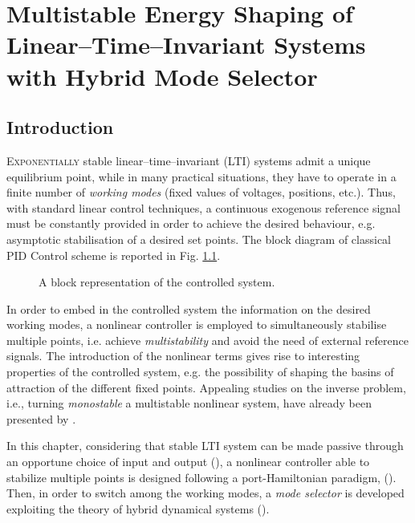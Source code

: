 %
\chapter{Multistable Energy Shaping of Linear--Time--Invariant Systems with Hybrid Mode Selector}

\label{chap:multistable}
\minitoc

\thispagestyle{empty}

\newpage
\section{Introduction}
\lettrine[lines=4]{\color{brickred}E}{xponentially} stable linear--time--invariant (LTI) systems admit a unique equilibrium point, while in many practical situations, they have to operate in a finite number of \textit{working modes} (fixed values of voltages, positions, etc.).
Thus, with standard linear control techniques, a continuous exogenous reference signal must be constantly provided in order to achieve the desired behaviour, e.g. asymptotic stabilisation of a desired set points. The block diagram of classical PID Control scheme is reported in Fig. \ref{fig:PID}.
%
\begin{figure}[!h]
	\centering
	
	\caption{A block representation of the controlled system.}
	\label{fig:PID}
\end{figure}
%
In order to embed in the controlled system the information on the desired working modes, a nonlinear controller is employed to simultaneously stabilise multiple points, i.e. achieve \textit{multistability} and avoid the need of external reference signals.
The introduction of the nonlinear terms gives rise to interesting properties of the controlled system, e.g. the possibility of shaping the basins of attraction of the different fixed points.
Appealing studies on the inverse problem, i.e., turning \textit{monostable} a {multistable} nonlinear system, have already been presented by \cite{PISARCHIK2014167}.

In this chapter, considering that stable LTI system can be made passive through an opportune choice of input and output (\cite{byrnes91}), a nonlinear controller able to stabilize multiple points is designed following a port-Hamiltonian paradigm, (\cite{876703,secchi2007control,ortega2008control,van2014port}). Then, in order to switch among the working modes, a \textit{mode selector} is developed exploiting the theory of hybrid dynamical systems (\cite{van2000introduction,goebel2008}).

